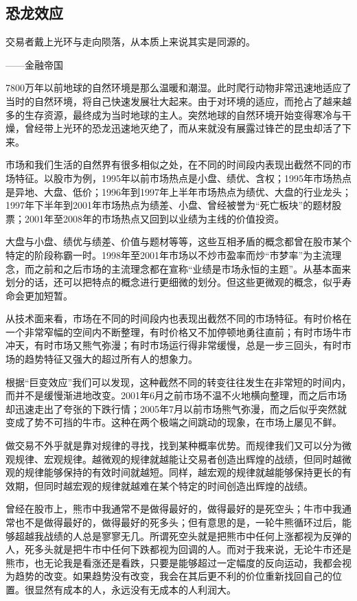 \subsection{恐龙效应}

{\kaishu
交易者戴上光环与走向陨落，从本质上来说其实是同源的。

\hfill ——金融帝国
}

7800万年以前地球的自然环境是那么温暖和潮湿。此时爬行动物非常迅速地适应了当时的自然环境，将自己快速发展壮大起来。由于对环境的适应，而抢占了越来越多的生存资源，最终成为当时地球的主人。突然地球的自然环境开始变得寒冷与干燥，曾经带上光环的恐龙迅速地灭绝了，而从来就没有展露过锋芒的昆虫却活了下来。

市场和我们生活的自然界有很多相似之处，在不同的时间段内表现出截然不同的市场特征。以股市为例，1995年以前市场热点是小盘、绩优、含权；1995年市场热点是异地、大盘、低价；1996年到1997年上半年市场热点为绩优、大盘的行业龙头；1997年下半年到2001年市场热点为绩差、小盘、曾经被誉为“死亡板块”的题材股票；2001年至2008年的市场热点又回到以业绩为主线的价值投资。

大盘与小盘、绩优与绩差、价值与题材等等，这些互相矛盾的概念都曾在股市某个特定的阶段称霸一时。1998年至2001年市场以不炒市盈率而炒“市梦率”为主流理念，而之前和之后市场的主流理念都在宣称“业绩是市场永恒的主题”。从基本面来划分的话，还可以把特点的概念进行更细微的划分。但这些更微观的概念，似乎寿命会更加短暂。

从技术面来看，市场在不同的时间段内也表现出截然不同的市场特征。有时价格在一个非常窄幅的空间内不断整理，有时价格又不加停顿地勇往直前；有时市场牛市冲天，有时市场又熊气弥漫；有时市场运行得非常缓慢，总是一步三回头，有时市场的趋势特征又强大的超过所有人的想象力。

根据“巨变效应”我们可以发现，这种截然不同的转变往往发生在非常短的时间内，而并不是缓慢渐进地改变。2001年6月之前市场不温不火地横向整理，而之后市场却迅速走出了夸张的下跌行情；2005年7月以前市场熊气弥漫，而之后似乎突然就变成了势不可挡的牛市。这种在两个极端之间跳动的现象，在市场上屡见不鲜。

做交易不外乎就是靠对规律的寻找，找到某种概率优势。而规律我们又可以分为微观规律、宏观规律。越微观的规律就越能让交易者创造出辉煌的战绩，但同时越微观的规律能够保持的有效时间就越短。同样，越宏观的规律就越能够保持更长的有效期，但同时越宏观的规律就越难在某个特定的时间创造出辉煌的战绩。

曾经在股市上，熊市中我通常不是做得最好的，做得最好的是死空头；牛市中我通常也不是做得最好的，做得最好的死多头；但有意思的是，一轮牛熊循环过后，能够超越我战绩的人总是寥寥无几。所谓死空头就是把熊市中任何上涨都视为反弹的人，死多头就是把牛市中任何下跌都视为回调的人。而对于我来说，无论牛市还是熊市，也无论我是看涨还是看跌，只要是能够超过一定幅度的反向运动，我都会视为趋势的改变。如果趋势没有改变，我会在其后更不利的价位重新找回自己的位置。很显然有成本的人，永远没有无成本的人利润大。

